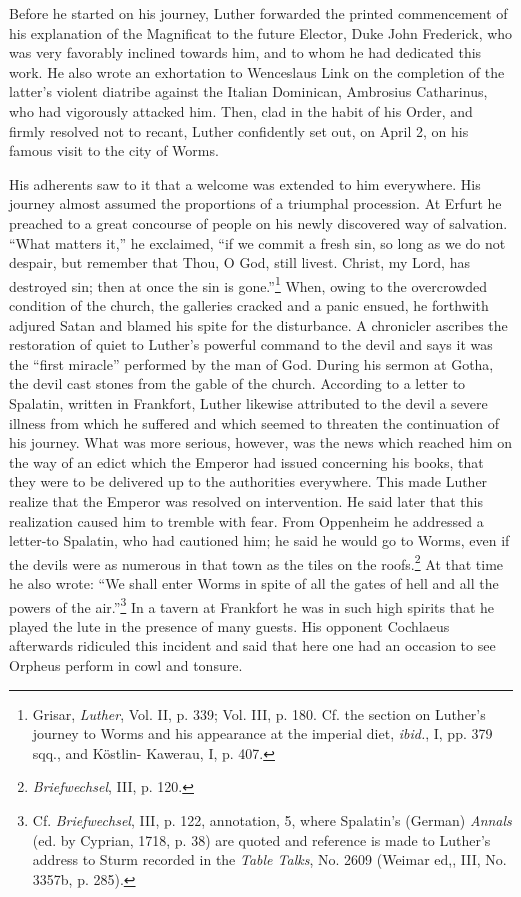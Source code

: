 Before he started on his journey, Luther forwarded the printed
commencement of his explanation of the Magnificat to the future
Elector, Duke John Frederick, who was very favorably inclined
towards him, and to whom
he had dedicated this work. He also wrote
an exhortation to Wenceslaus Link on the completion of the latter’s
violent diatribe against the Italian Dominican, Ambrosius Catharinus,
who had vigorously attacked him. Then, clad in the habit of his Order,
and firmly resolved not to recant, Luther confidently set out,
on April 2, on his famous visit to the city of Worms.

His adherents saw to it that a welcome was extended to him everywhere.
His journey almost assumed the proportions of a triumphal
procession. At Erfurt he preached to a great concourse of people on
his newly discovered way of salvation. “What matters it,” he exclaimed,
“if we commit a fresh sin, so long as we do not despair, but
remember that Thou, O God, still livest. Christ, my Lord, has destroyed
sin; then at once the sin is gone.”\footnote
{Grisar, \textit{Luther}, Vol. II, p. 339; Vol. III, p. 180. Cf. the section on Luther’s journey
to Worms and his appearance at the imperial diet, \textit{ibid.}, I, pp. 379 sqq., and Köstlin-
Kawerau, I, p. 407.}
When, owing to the overcrowded condition
of the church, the galleries cracked and a panic
ensued, he forthwith adjured Satan and blamed his spite for the disturbance.
A chronicler ascribes the restoration of quiet to Luther’s
powerful command to the devil and says it was the “first miracle”
performed by the man of God. During his sermon at Gotha, the
devil cast stones from the gable of the church. According to a letter
to Spalatin, written in Frankfort, Luther likewise attributed to the
devil a severe illness from which he suffered and which seemed to
threaten the continuation of his journey. What was more serious,
however, was the news which reached him on the way of an edict
which the Emperor had issued concerning his books, that they were to
be delivered up to the authorities everywhere. This made Luther realize
that the Emperor was resolved on intervention. He said later that
this realization caused him to tremble with fear. From Oppenheim
he addressed a letter-to Spalatin, who had cautioned him; he said he
would go to Worms, even if the devils were as numerous in that town
as the tiles on the roofs.\footnote{\textit{Briefwechsel}, III, p. 120.}
At that time he also wrote: “We shall enter
Worms in spite of all the gates of hell and all the powers of the
air.”\footnote
{Cf. \textit{Briefwechsel}, III, p. 122, annotation, 5, where Spalatin’s (German) \textit{Annals} (ed. by
Cyprian, 1718, p. 38) are quoted and reference is made to Luther’s address to Sturm recorded
in the \textit{Table Talks}, No. 2609 (Weimar ed,, III, No. 3357b, p. 285).}
In a tavern at Frankfort he was in such high spirits that he
played the lute in the presence of many guests. His opponent Cochlaeus afterwards
ridiculed this incident and said that here one had an
occasion to see Orpheus perform in cowl and tonsure.

